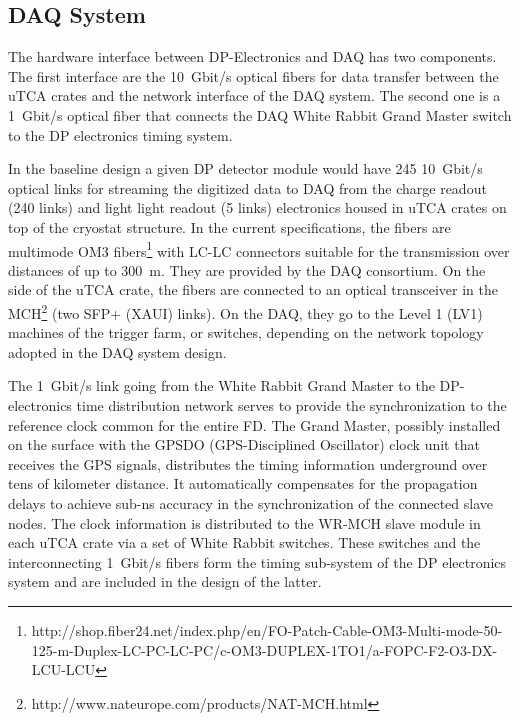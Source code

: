 

\subsection{DAQ System}
\label{sec:fddp-tpc-elec-intfc-daq}

The hardware interface between DP-Electronics and DAQ has two components. The first interface are the \SI{10}{Gbit/s} optical fibers for data transfer between the uTCA crates and the network interface of the DAQ system. The second one is a \SI{1}{Gbit/s} optical fiber that connects the DAQ White Rabbit Grand Master switch to the DP electronics timing system.   

In the baseline design a given DP detector module would have \num{245} \SI{10}{Gbit/s} optical links for streaming the digitized data to DAQ from the charge readout (\num{240} links) and light light readout (\num{5} links) electronics housed in uTCA crates on top of the cryostat structure.  In the current specifications, the fibers are multimode OM3 fibers\footnote{http://shop.fiber24.net/index.php/en/FO-Patch-Cable-OM3-Multi-mode-50-125-m-Duplex-LC-PC-LC-PC/c-OM3-DUPLEX-1TO1/a-FOPC-F2-O3-DX-LCU-LCU} with LC-LC connectors suitable for the transmission over distances of up to \SI{300}{\metre}.  They are provided by the DAQ consortium. On the side of the uTCA crate, the fibers are connected to an optical transceiver in the MCH\footnote{http://www.nateurope.com/products/NAT-MCH.html} (two SFP+ (XAUI) links).  On the DAQ, they go to the Level 1 (LV1) machines of the trigger farm, or switches, depending on the network topology adopted in the DAQ system design.

The \SI{1}{Gbit/s} link going from the White Rabbit Grand Master to the DP-electronics time distribution network serves to provide the synchronization to the reference clock common for the entire FD. The Grand Master, possibly installed on the surface with the GPSDO (GPS-Disciplined Oscillator) clock unit that receives the GPS signals, distributes the timing information underground over tens of kilometer distance. It automatically compensates for the propagation delays to achieve sub-ns accuracy in the synchronization of the connected slave nodes. The clock information is distributed to the WR-MCH slave module in each uTCA crate via a set of White Rabbit switches. These switches and the interconnecting \SI{1}{Gbit/s} fibers form the timing sub-system of the DP electronics system and are included in the design of the latter.    

